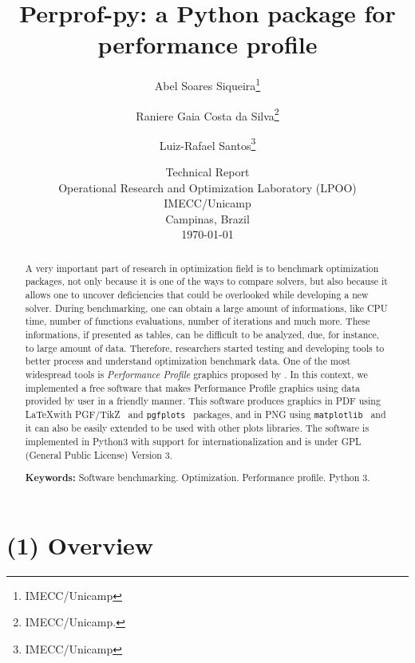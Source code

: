 \documentclass[10pt,a4paper]{article}
\begin{document}
\title{Perprof-py: a {P}ython package for performance profile}
\author{ Abel Soares Siqueira\thanks{IMECC/Unicamp}  \and Raniere Gaia Costa da
  Silva\thanks{IMECC/Unicamp.} \and Luiz-Rafael Santos\thanks{IMECC/Unicamp}}
\date{Technical Report \\ Operational Research and Optimization Laboratory
  (LPOO) \\ IMECC/Unicamp \\ Campinas, Brazil \\ \today}
\maketitle

\begin{abstract}
    A very important part of research in optimization field is to benchmark
    optimization packages, not only because it is one of the ways to compare
    solvers, but also because it allows one to uncover deficiencies that could
    be overlooked while developing a new solver. During benchmarking, one can
    obtain a large amount of  informations, like CPU time, number of functions
    evaluations, number of iterations and much more. These informations, if
    presented as tables, can be difficult to be analyzed, due, for instance, to
    large amount of data.  Therefore, researchers started testing and developing
    tools to better process and understand optimization benchmark data. One of
    the most widespread tools is \emph{Performance Profile} graphics proposed by
    \textcite{Dolan:2002du}. In this context, we implemented a free software
    that makes Performance Profile graphics using data provided by user in a
    friendly manner. This software produces graphics in PDF using \LaTeX with
    PGF/TikZ~\cite{TikZ} and \texttt{pgfplots}~\cite{pgfplots} packages, and in
    PNG using \texttt{matplotlib}~\cite{Hunter:2007} and it can also be easily
    extended to be used with other plots libraries. The software is implemented
    in Python3 with support for internationalization and is under GPL (General
    Public License) Version 3.

    \textbf{Keywords:} Software benchmarking.  Optimization. Performance profile. Python 3.
\end{abstract}

\section*{(1) Overview}
\end{document}
